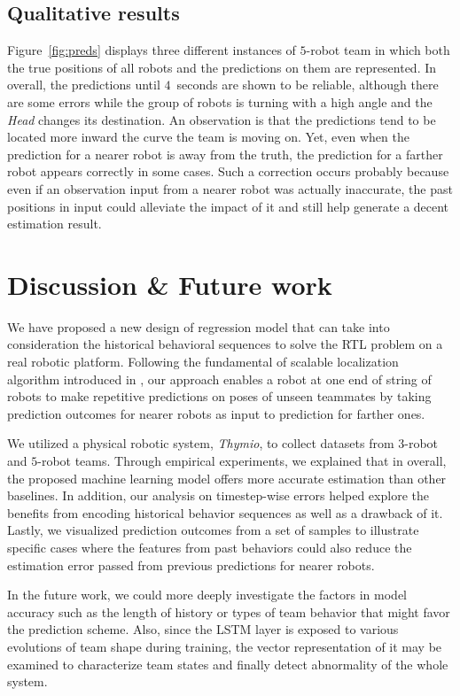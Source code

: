 \documentclass[letterpaper, 10 pt, conference]{ieeeconf}  %
\begin{document}
	
	\subsection{Qualitative results} 
	\label{sec:qualitative_results} 

	Figure~\ref{fig:preds} displays three different instances of $5$-robot team
	in which both the true positions of all robots and the predictions on them are represented. 
	In overall, the predictions
	until $4$~seconds are shown to be reliable, although there are some errors while the
	group of robots is turning with a high angle and the \emph{Head} changes its destination. 
	An observation is that the predictions tend to be located more inward the curve the team is moving on. 
	Yet, even when the prediction for a nearer robot is away from the truth, the prediction 
	for a farther robot appears correctly in some cases. 
	Such a correction occurs probably because even if an observation input from a nearer robot was 
	actually inaccurate, the past positions in input could alleviate the impact of it and still 
	help generate a decent estimation result.


	\section{Discussion \& Future work}
	\label{sec:discussion_and_future_work}
	
	We have proposed a new design of regression model that can take into consideration 
	the historical behavioral sequences to solve the RTL problem on a real robotic platform. 
	Following the fundamental of scalable localization algorithm introduced in \cite{CPR17}, 
	our approach enables a robot at one end of string of robots to make repetitive predictions 
	on poses of unseen teammates by taking prediction outcomes for nearer robots as input to 
	prediction for farther ones.
	
	We utilized a physical robotic system, \emph{Thymio}, to collect datasets from 
	$3$-robot and $5$-robot teams. Through empirical experiments, we explained that in overall,
	the proposed machine learning model offers more accurate estimation than other baselines.
	In addition, our analysis on timestep-wise errors helped 
	explore the benefits from encoding historical behavior sequences as well as a
	drawback of it. Lastly, we visualized prediction outcomes from a set of samples to 
	illustrate specific cases where the features from past behaviors could also reduce the 
	estimation error passed from previous predictions for nearer robots. 
	
	In the future work, we could more deeply investigate the factors in model accuracy such as 
	the length of history or types of team behavior that might favor the prediction scheme. 
	Also, since the LSTM layer is exposed 
	to various evolutions of team shape during training, the vector representation of it 
	may be examined to characterize team states and finally detect abnormality of the whole
	system. 
	 
	
{\small
	
	
}
\end{document}
